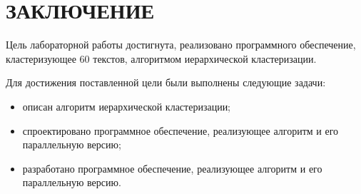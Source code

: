 \chapter*{ЗАКЛЮЧЕНИЕ}

Цель лабораторной работы достигнута, реализовано программного обеспечение,
кластеризующее 60 текстов, алгоритмом иерархической кластеризации.

Для достижения поставленной цели были выполнены следующие задачи:
\begin{itemize}
	\item описан алгоритм иерархической кластеризации;
	\item спроектировано программное обеспечение, реализующее алгоритм и его параллельную версию;
	\item разработано программное обеспечение, реализующее алгоритм и его
	параллельную версию.
\end{itemize}
